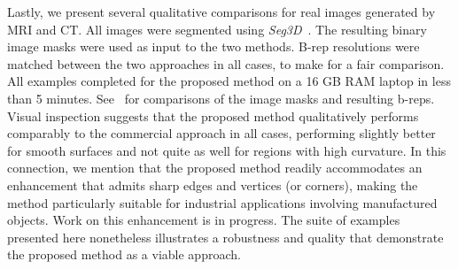 \noindent Lastly, we present several qualitative comparisons for real images generated by MRI and CT.  All images were segmented using \textit{Seg3D}~\cite{Seg3D}. The resulting binary image masks were used as input to the two methods. B-rep resolutions were matched between the two approaches in all cases, to make for a fair comparison. All examples completed for the proposed method on a 16 GB RAM laptop in less than 5 minutes. See~ for comparisons of the image masks and resulting b-reps. Visual inspection suggests that the proposed method qualitatively performs comparably to the commercial approach in all cases, performing slightly better for smooth surfaces and not quite as well for regions with high curvature.  In this connection, we mention that the proposed method readily accommodates an enhancement that admits sharp edges and vertices (or corners), making the method particularly suitable for industrial applications involving manufactured objects.  Work on this enhancement is in progress.  The suite of examples presented here nonetheless illustrates a robustness and quality that demonstrate the proposed method as a viable approach.
